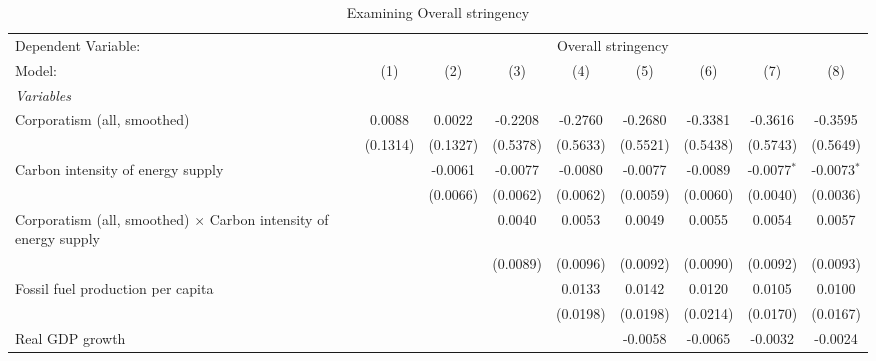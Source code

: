
\begin{table}[htbp]
   \caption{Examining Overall stringency}
   \centering
   \begin{tabular}{lcccccccc}
      \tabularnewline \midrule \midrule
      Dependent Variable: & \multicolumn{8}{c}{Overall stringency}\\
      Model:                                                                  & (1)                   & (2)      & (3)      & (4)      & (5)      & (6)      & (7)           & (8)\\  
      \midrule
      \emph{Variables}\\
      Corporatism (all, smoothed)                                             & 0.0088                & 0.0022   & -0.2208  & -0.2760  & -0.2680  & -0.3381  & -0.3616       & -0.3595\\   
                                                                              & (0.1314)              & (0.1327) & (0.5378) & (0.5633) & (0.5521) & (0.5438) & (0.5743)      & (0.5649)\\   
      Carbon intensity of energy supply                                       &                       & -0.0061  & -0.0077  & -0.0080  & -0.0077  & -0.0089  & -0.0077$^{*}$ & -0.0073$^{*}$\\   
                                                                              &                       & (0.0066) & (0.0062) & (0.0062) & (0.0059) & (0.0060) & (0.0040)      & (0.0036)\\   
      Corporatism (all, smoothed) $\times$ Carbon intensity of energy supply  &                       &          & 0.0040   & 0.0053   & 0.0049   & 0.0055   & 0.0054        & 0.0057\\   
                                                                              &                       &          & (0.0089) & (0.0096) & (0.0092) & (0.0090) & (0.0092)      & (0.0093)\\   
      Fossil fuel production per capita                                       &                       &          &          & 0.0133   & 0.0142   & 0.0120   & 0.0105        & 0.0100\\   
                                                                              &                       &          &          & (0.0198) & (0.0198) & (0.0214) & (0.0170)      & (0.0167)\\   
      Real GDP growth                                                         &                       &          &          &          & -0.0058  & -0.0065  & -0.0032       & -0.0024\\   

\end{tabular}
\end{table}
